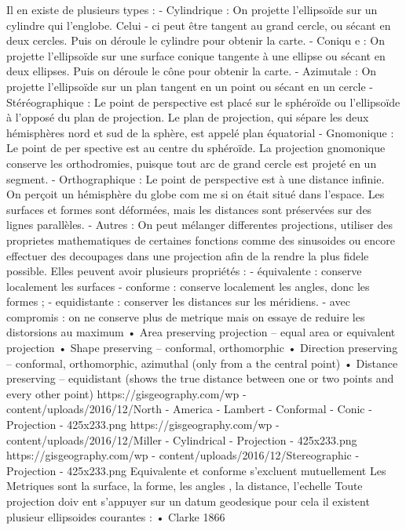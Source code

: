 \documentclass{article}
\begin{document}
Il en existe de plusieurs types
: 
-
Cylindrique
: On projette l'ellipsoïde sur un cylindre qui l'englobe. Celui
-
ci peut être tangent au 
grand cercle, ou sécant en deux cercles. Puis on déroule le cylindre pour obtenir la carte.
-
Coniqu
e
: On projette l'ellipsoïde sur une surface conique tangente à une ellipse ou sécant en deux 
ellipses. Puis on déroule le cône pour obtenir la carte.
-
Azimutale
: On projette l'ellipsoïde sur un plan tangent en un point ou sécant en un cercle
-
Stéréographique
: Le point de perspective est placé sur le sphéroïde ou l'ellipsoïde à l'opposé du 
plan de projection. Le plan de projection, qui sépare les deux
hémisphères
nord et sud de la sphère, 
est appelé plan équatorial
-
Gnomonique
: Le point de per
spective est au centre du sphéroïde. La projection gnomonique 
conserve les
orthodromies, puisque tout arc de grand cercle est projeté en un segment.
-
Orthographique
: Le point de perspective est à une distance
infinie. On perçoit 
un
hémisphère
du
globe
com
me si on était situé dans l'espace. Les
surfaces
et formes 
sont
déformées, mais les distances sont préservées sur des lignes parallèles.
-
Autres
: On peut mélanger differentes projections, utiliser des proprietes mathematiques de 
certaines fonctions comme 
des sinusoides ou encore effectuer des decoupages dans une projection 
afin de la rendre la plus fidele possible.
Elles peuvent avoir plusieurs propriétés
:
-
équivalente
: conserve localement les surfaces
-
conforme
: conserve localement les angles, donc 
les formes
;
-
equidistante
:
conserver les distances sur les méridiens.
-
avec compromis
: on ne conserve plus de metrique mais on essaye de reduire les distorsions au 
maximum
•
Area preserving projection 
–
equal area or equivalent projection
•
Shape 
preserving 
–
conformal, orthomorphic
•
Direction preserving 
–
conformal, orthomorphic, azimuthal (only from a the central 
point)
•
Distance preserving 
–
equidistant (shows the true distance between one or two 
points and every other point)
https://gisgeography.com/wp
-
content/uploads/2016/12/North
-
America
-
Lambert
-
Conformal
-
Conic
-
Projection
-
425x233.png
https://gisgeography.com/wp
-
content/uploads/2016/12/Miller
-
Cylindrical
-
Projection
-
425x233.png
https://gisgeography.com/wp
-
content/uploads/2016/12/Stereographic
-
Projection
-
425x233.png
Equivalente et conforme s’excluent mutuellement
Les Metriques sont la surface, la forme, les angles , la distance, l’echelle
Toute projection doiv
ent s’appuyer sur un datum
geodesique pour cela il existent plusieur ellipsoides 
courantes
:
•
Clarke 1866
\end{document}
